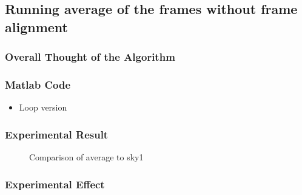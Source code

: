 \subsection{Running average of the frames without frame alignment}

\subsubsection{Overall Thought of the Algorithm}
{
    
}

\subsubsection{Matlab Code}
\begin{itemize}
    \item Loop version
    
\end{itemize}

\subsubsection{Experimental Result}
\begin{figure}[H]
\caption{Comparison of average to sky1}
\end{figure}

\subsubsection{Experimental Effect}
{
    \indent
    \\ \\
}